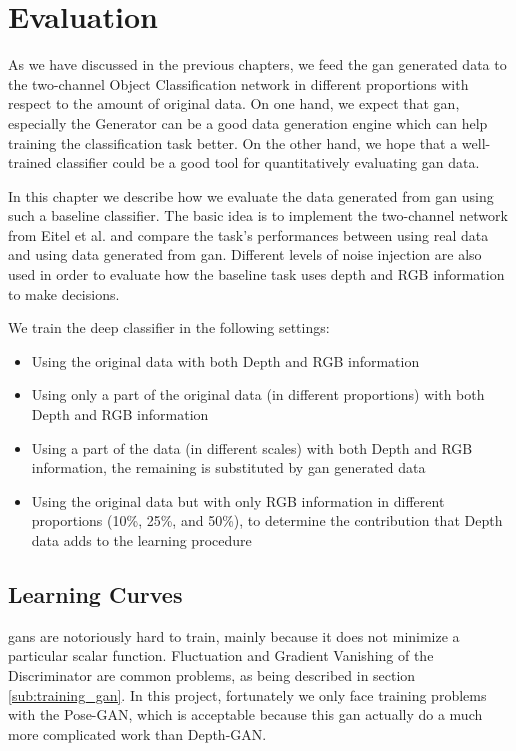 
\chapter{Evaluation\label{cha:evaluation}}
As we have discussed in the previous chapters, we feed the \acrshort{gan} generated data
to the two-channel Object Classification network in different proportions with respect to
the amount of original data. On one hand, we expect that \acrshort{gan}, especially the
Generator can be a good data generation engine which can help training the classification
task better. On the other hand, we hope that a well-trained classifier could be a good
tool for quantitatively evaluating \acrshort{gan} data.

In this chapter we describe how we evaluate the data generated from \acrshort{gan} using
such a baseline classifier. The basic idea is to implement the two-channel network from
Eitel et al. \cite{eitel} and compare the task's performances between using real data and
using data generated from \acrshort{gan}. Different levels of noise injection are also
used in order to evaluate how the baseline task uses depth and RGB information to make
decisions.

We train the deep classifier in the following settings:

\begin{itemize}
	\item Using the original data with both Depth and RGB information
	\item Using only a part of the original data (in different proportions) with both Depth and
		RGB information
	\item Using a part of the data (in different scales) with both Depth and RGB
		information, the remaining is substituted by \acrshort{gan} generated data
	\item Using the original data but with only RGB information in different proportions
		(10\%, 25\%, and 50\%), to determine the contribution that Depth data adds to the
		learning procedure
\end{itemize}

\section{Learning Curves}
\label{sec:learning_curves}

\acrshort{gan}s are notoriously hard to train, mainly because it does not minimize a
particular scalar function. Fluctuation and Gradient Vanishing of the Discriminator are
common problems, as being described in section \ref{sub:training_gan}. In this project,
fortunately we only face training problems with the Pose-GAN, which is acceptable because
this \acrshort{gan} actually do a much more complicated work than Depth-GAN.

